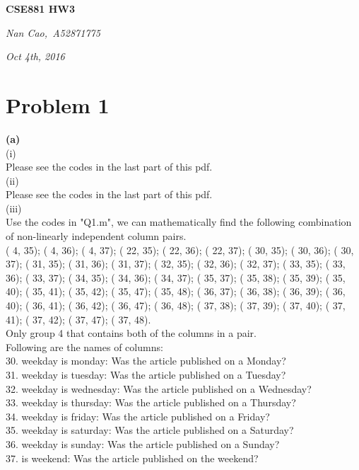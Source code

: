 \documentclass[11pt]{scrartcl}
\begin{document}
\centerline{\LARGE{\textbf{CSE881 HW3}}}
\centerline{\large{\textit{Nan Cao,\  A52871775}}}
\centerline{\large{\textit{Oct 4th, 2016}}}
\section*{Problem 1}
\textbf{(a)}\\
(i)\\
Please see the codes in the last part of this pdf.\\
(ii)\\
Please see the codes in the last part of this pdf.\\
(iii)\\
Use the codes in "Q1.m", we can mathematically find the following combination of non-linearly independent column pairs.\\
( 4, 35); ( 4, 36); ( 4, 37); ( 22, 35); ( 22, 36); ( 22, 37); ( 30, 35); ( 30, 36); ( 30, 37); ( 31, 35); ( 31, 36); ( 31, 37); ( 32, 35); ( 32, 36); ( 32, 37); ( 33, 35); ( 33, 36); ( 33, 37); ( 34, 35); ( 34, 36); ( 34, 37); ( 35, 37); ( 35, 38); ( 35, 39); ( 35, 40); ( 35, 41); ( 35, 42); ( 35, 47); ( 35, 48); ( 36, 37); ( 36, 38); ( 36, 39); ( 36, 40); ( 36, 41); ( 36, 42); ( 36, 47); ( 36, 48); ( 37, 38); ( 37, 39); ( 37, 40); ( 37, 41); ( 37, 42); ( 37, 47); ( 37, 48).\\
Only group 4 that contains both of the columns in a pair.\\
Following are the names of columns:\\
    30. weekday  is  monday:             Was the article published on a Monday?\\
    31. weekday  is  tuesday:            Was the article published on a Tuesday?\\
    32. weekday  is  wednesday:          Was the article published on a Wednesday?\\
    33. weekday  is  thursday:           Was the article published on a Thursday?\\
    34. weekday  is  friday:             Was the article published on a Friday?\\
    35. weekday  is  saturday:           Was the article published on a Saturday?\\
    36. weekday  is  sunday:             Was the article published on a Sunday?\\
    37. is  weekend:                    Was the article published on the weekend?\\
\end{document}
